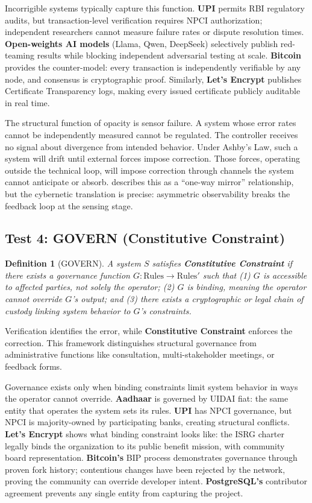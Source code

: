 \documentclass{article}
\newtheorem{definition}{Definition}
\begin{document}
Incorrigible systems typically capture this function. \textbf{UPI} permits RBI regulatory audits, but transaction-level verification requires NPCI authorization; independent researchers cannot measure failure rates or dispute resolution times. \textbf{Open-weights AI models} (Llama, Qwen, DeepSeek) selectively publish red-teaming results while blocking independent adversarial testing at scale. \textbf{Bitcoin} provides the counter-model: every transaction is independently verifiable by any node, and consensus is cryptographic proof. Similarly, \textbf{Let's Encrypt} publishes Certificate Transparency logs, making every issued certificate publicly auditable in real time.

The structural function of opacity is sensor failure. A system whose error rates cannot be independently measured cannot be regulated. The controller receives no signal about divergence from intended behavior. Under Ashby's Law, such a system will drift until external forces impose correction. Those forces, operating outside the technical loop, will impose correction through channels the system cannot anticipate or absorb. \citet{pasquale2015} describes this as a ``one-way mirror'' relationship, but the cybernetic translation is precise: asymmetric observability breaks the feedback loop at the sensing stage.

\subsection{Test 4: GOVERN (Constitutive Constraint)}

\begin{definition}[GOVERN]
\label{def:govern}
A system $S$ satisfies \textbf{Constitutive Constraint} if there exists a governance function $G: \text{Rules} \to \text{Rules}'$ such that (1) $G$ is accessible to affected parties, not solely the operator; (2) $G$ is binding, meaning the operator cannot override $G$'s output; and (3) there exists a cryptographic or legal chain of custody linking system behavior to $G$'s constraints.
\end{definition}

Verification identifies the error, while \textbf{Constitutive Constraint} enforces the correction. This framework distinguishes structural governance from administrative functions like consultation, multi-stakeholder meetings, or feedback forms.

Governance exists only when binding constraints limit system behavior in ways the operator cannot override. \textbf{Aadhaar} is governed by UIDAI fiat: the same entity that operates the system sets its rules. \textbf{UPI} has NPCI governance, but NPCI is majority-owned by participating banks, creating structural conflicts. \textbf{Let's Encrypt} shows what binding constraint looks like: the ISRG charter legally binds the organization to its public benefit mission, with community board representation. \textbf{Bitcoin's} BIP process demonstrates governance through proven fork history; contentious changes have been rejected by the network, proving the community can override developer intent. \textbf{PostgreSQL's} contributor agreement prevents any single entity from capturing the project.
\end{document}
